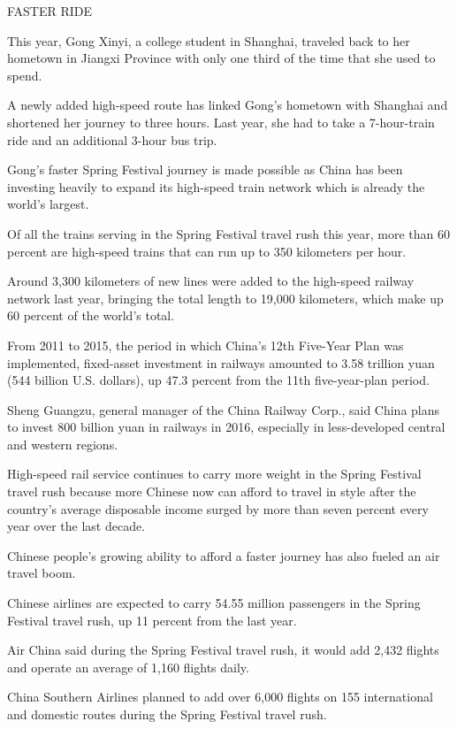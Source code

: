 \begin{displayquote}
	FASTER RIDE

	This year, Gong Xinyi, a college student in Shanghai, traveled back to
	her hometown in Jiangxi Province with only one third of the time that
	she used to spend.

	A newly added high-speed route has linked Gong's hometown with Shanghai
	and shortened her journey to three hours. Last year, she had to take a
	7-hour-train ride and an additional 3-hour bus trip.

	Gong's faster Spring Festival journey is made possible as China has been
	investing heavily to expand its high-speed train network which is
	already the world's largest.

	Of all the trains serving in the Spring Festival travel rush this year,
	more than 60 percent are high-speed trains that can run up to 350
	kilometers per hour.

	Around 3,300 kilometers of new lines were added to the high-speed
	railway network last year, bringing the total length to 19,000
	kilometers, which make up 60 percent of the world's total.

	From 2011 to 2015, the period in which China's 12th Five-Year Plan was
	implemented, fixed-asset investment in railways amounted to 3.58
	trillion yuan (544 billion U.S. dollars), up 47.3 percent from the 11th
	five-year-plan period.

	Sheng Guangzu, general manager of the China Railway Corp., said China
	plans to invest 800 billion yuan in railways in 2016, especially in
	less-developed central and western regions.

	High-speed rail service continues to carry more weight in the Spring
	Festival travel rush because more Chinese now can afford to travel in
	style after the country's average disposable income surged by more than
	seven percent every year over the last decade.

	Chinese people's growing ability to afford a faster journey has also
	fueled an air travel boom.

	Chinese airlines are expected to carry 54.55 million passengers in the
	Spring Festival travel rush, up 11 percent from the last year.

	Air China said during the Spring Festival travel rush, it would add
	2,432 flights and operate an average of 1,160 flights daily.

	China Southern Airlines planned to add over 6,000 flights on 155
	international and domestic routes during the Spring Festival travel
	rush.


\end{displayquote}
